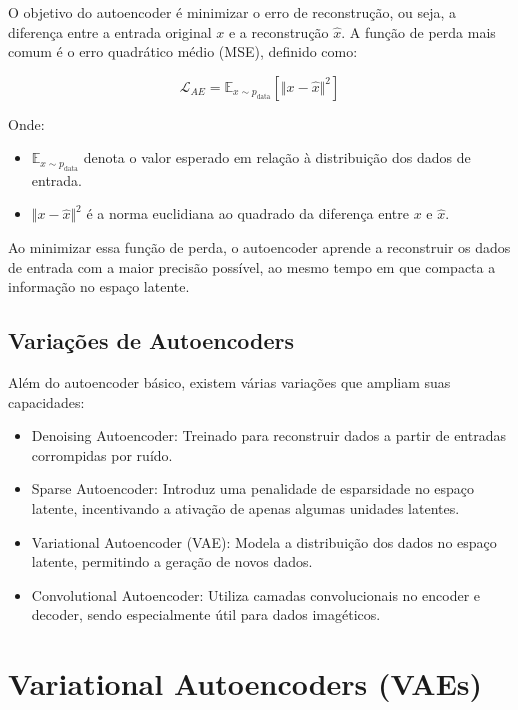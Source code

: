 \documentclass[a4paper]{tufte-handout}
\begin{document}
O objetivo do autoencoder é minimizar o erro de reconstrução, ou seja, a diferença entre a entrada original $x$ e a reconstrução $\hat{x}$. 
A função de perda mais comum é o erro quadrático médio (MSE), definido como:

\begin{equation*}
    \mathcal{L}_{AE} = \mathbb{E}_{x \sim p_{\text{data}}} \left[ \Vert x - \hat{x} \Vert^2 \right]
\end{equation*}

Onde:
\begin{itemize}
    \item $\mathbb{E}_{x \sim p_{\text{data}}}$ denota o valor esperado em relação à distribuição dos dados de entrada.
    \item $\Vert x - \hat{x} \Vert^2$ é a norma euclidiana ao quadrado da diferença entre $x$ e $\hat{x}$.
\end{itemize}


Ao minimizar essa função de perda, o autoencoder aprende a reconstruir os dados de entrada com a maior precisão possível, ao mesmo tempo em que compacta a informação no espaço latente.

\subsection{Variações de Autoencoders}

Além do autoencoder básico, existem várias variações que ampliam suas capacidades:
\begin{itemize}
    \item Denoising Autoencoder: Treinado para reconstruir dados a partir de entradas corrompidas por ruído.
    \item Sparse Autoencoder: Introduz uma penalidade de esparsidade no espaço latente, incentivando a ativação de apenas algumas unidades latentes.
    \item Variational Autoencoder (VAE): Modela a distribuição dos dados no espaço latente, permitindo a geração de novos dados.
    \item Convolutional Autoencoder: Utiliza camadas convolucionais no encoder e decoder, sendo especialmente útil para dados imagéticos.
\end{itemize}


\section{Variational Autoencoders (VAEs)}
\end{document}
